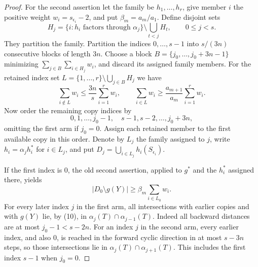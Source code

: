 \begin{proof}
For the second assertion let the family be $h_1,\ldots,h_r$, give
member $i$ the positive weight $w_i=s_{\epsilon_i}-2$, and put
$\beta_m=a_m/a_1$. Define disjoint sets
\[
 H_j=\{i:h_i\text{ factors through }\alpha_j\}
          \setminus\bigcup_{t<j}H_t,
 \qquad 0\leq j<s.
\]
They partition the family. Partition the indices $0,\ldots,s-1$ into
$s/(3n)$ consecutive blocks of length $3n$. Choose a block
$B=\{j_0,\ldots,j_0+3n-1\}$ minimizing
$\sum_{j\in B}\sum_{i\in H_j}w_i$, and discard its assigned family
members. For the retained index set
$L=\{1,\ldots,r\}\setminus\bigcup_{j\in B}H_j$ we have
\[
 \sum_{i\notin L}w_i\leq\frac{3n}{s}\sum_{i=1}^r w_i,
 \qquad
 \sum_{i\in L}w_i\geq\frac{a_{m+1}}{a_m}\sum_{i=1}^r w_i.
\]
Now order the remaining copy indices by
\[
 0,1,\ldots,j_0-1,\quad s-1,s-2,\ldots,j_0+3n,
\]
omitting the first arm if $j_0=0$. Assign each retained member to
the first available copy in this order. Denote by $L_j$ the family
assigned to $j$, write $h_i=\alpha_jh_i^*$ for $i\in L_j$, and put
$D_j=\bigcup_{i\in L_j}h_i(S_{\epsilon_i})$.

If the first index is $0$, the old second assertion, applied to
$g^*$ and the $h_i^*$ assigned there, yields
\[
 |D_0\setminus g(Y)|\geq\beta_m\sum_{i\in L_0}w_i.
\]
For every later index $j$ in the first arm, all intersections with
earlier copies and with $g(Y)$ lie, by (10), in
$\alpha_j(T)\cap\alpha_{j-1}(T)$. Indeed all backward distances
are at most $j_0-1<s-2n$. For an index $j$ in the second arm, every
earlier index, and also $0$, is reached in the forward cyclic
direction in at most $s-3n$ steps, so those intersections lie in
$\alpha_j(T)\cap\alpha_{j+1}(T)$. This includes the first index
$s-1$ when $j_0=0$.


\end{proof}
